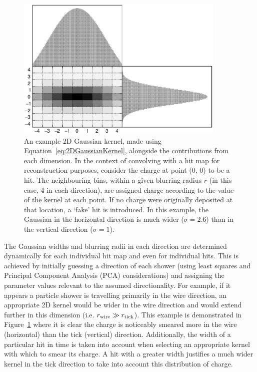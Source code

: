 \begin{figure}
  \centering
  \includegraphics[width=10cm]{2DGaussianKernel.eps}
  \caption[An example 2D Gaussian kernel alongside the contributions from each dimension.]{An example 2D Gaussian kernel, made using Equation~\ref{eq:2DGaussianKernel}, alongside the contributions from each dimension.  In the context of convolving with a hit map for reconstruction purposes, consider the charge at point (0, 0) to be a hit.  The neighbouring bins, within a given blurring radius $r$ (in this case, 4 in each direction), are assigned charge according to the value of the kernel at each point.  If no charge were originally deposited at that location, a `fake' hit is introduced.  In this example, the Gaussian in the horizontal direction is much wider ($\sigma=2.6$) than in the vertical direction ($\sigma=1$).}
  \label{fig:2DGaussianKernel}
\end{figure}

The Gaussian widths and blurring radii in each direction are determined dynamically for each individual hit map and even for individual hits.  This is achieved by initially guessing a direction of each shower (using least squares and Principal Component Analysis (PCA) considerations) and assigning the parameter values relevant to the assumed directionality.  For example, if it appears a particle shower is travelling primarily in the wire direction, an appropriate 2D kernel would be wider in the wire direction and would extend further in this dimension (i.e. $r_{\textnormal{wire}} \gg r_{\textnormal{tick}}$).  This example is demonstrated in Figure~\ref{fig:2DGaussianKernel} where it is clear the charge is noticeably smeared more in the wire (horizontal) than the tick (vertical) direction.  Additionally, the width of a particular hit in time is taken into account when selecting an appropriate kernel with which to smear its charge.  A hit with a greater width justifies a much wider kernel in the tick direction to take into account this distribution of charge.

